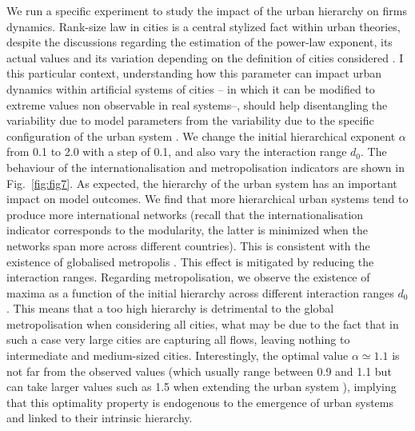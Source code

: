 \documentclass[10pt,letterpaper]{article}
\begin{document}
We run a specific experiment to study the impact of the urban hierarchy on firms dynamics. Rank-size law in cities is a central stylized fact within urban theories, despite the discussions regarding the estimation of the power-law exponent, its actual values and its variation depending on the definition of cities considered \cite{cottineau2017metazipf,corral2020truncated}. I this particular context, understanding how this parameter can impact urban dynamics within artificial systems of cities -- in which it can be modified to extreme values non observable in real systems--, should help disentangling the variability due to model parameters from the variability due to the specific configuration of the urban system \cite{raimbault2019space}. We change the initial hierarchical exponent $\alpha$ from 0.1 to 2.0 with a step of 0.1, and also vary the interaction range $d_0$. The behaviour of the internationalisation and metropolisation indicators are shown in Fig.~\ref{fig:fig7}. As expected, the hierarchy of the urban system has an important impact on model outcomes. We find that more hierarchical urban systems tend to produce more international networks (recall that the internationalisation indicator corresponds to the modularity, the latter is minimized when the networks span more across different countries). This is consistent with the existence of globalised metropolis \cite{sassen1991global}. This effect is mitigated by reducing the interaction ranges. Regarding metropolisation, we observe the existence of maxima as a function of the initial hierarchy across different interaction ranges $d_0$. This means that a too high hierarchy is detrimental to the global metropolisation when considering all cities, what may be due to the fact that in such a case very large cities are capturing all flows, leaving nothing to intermediate and medium-sized cities. Interestingly, the optimal value $\alpha \simeq 1.1$ is not far from the observed values (which usually range between 0.9 and 1.1 but can take larger values such as 1.5 when extending the urban system \cite{Raimbault_2020}), implying that this optimality property is endogenous to the emergence of urban systems and linked to their intrinsic hierarchy.
\end{document}
